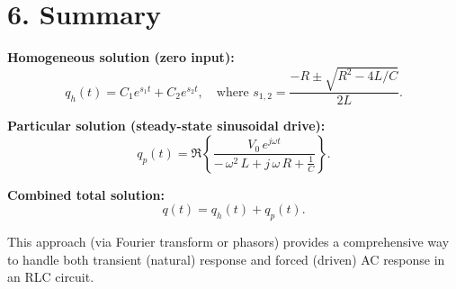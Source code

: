 \documentclass[12pt]{article}
\begin{document}
\vspace{1em}
\section*{6. Summary}

\noindent \textbf{Homogeneous solution (zero input):}
\[
q_h(t) = C_1 e^{s_1 t} + C_2 e^{s_2 t}, \quad \text{where } s_{1,2} = \frac{-R \pm \sqrt{R^2 - 4L/C}}{2L}.
\]

\noindent \textbf{Particular solution (steady-state sinusoidal drive):}
\[
q_p(t) = \Re\!\left\{\frac{V_0\, e^{j\omega t}}{-\,\omega^2\,L + j\,\omega\,R + \tfrac{1}{C}}\right\}.
\]

\noindent \textbf{Combined total solution:}
\[
q(t) = q_h(t) + q_p(t).
\]

\noindent This approach (via Fourier transform or phasors) provides a comprehensive way to handle both transient (natural) response and forced (driven) AC response in an RLC circuit.
\end{document}
